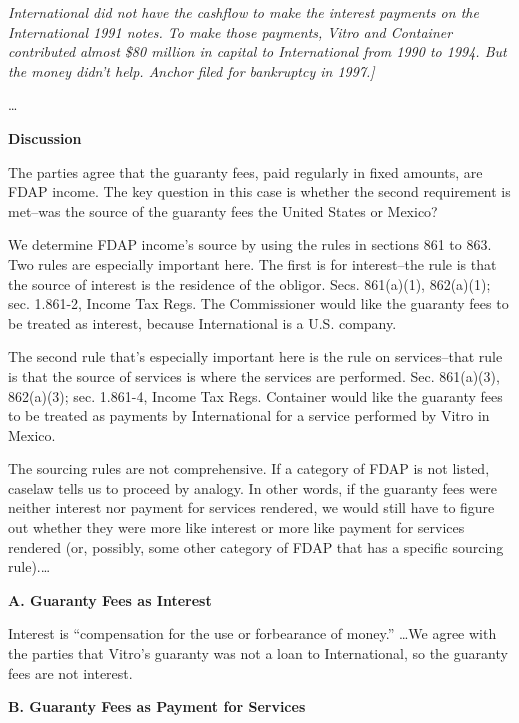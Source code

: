 \begin{select}
\textit{International did not have the cashflow to make the interest payments on the International 1991 notes. To make those payments, Vitro and Container contributed almost \$80 million in capital to International from 1990 to 1994. But the money didn't help.  Anchor filed for bankruptcy in 1997.]}

\ldots

\begin{center} \textbf{Discussion}
\end{center}

The parties agree that the guaranty fees, paid regularly in fixed amounts, are FDAP income. The key question in this case is whether the second requirement is met--was the source of the guaranty fees the United States or Mexico?

We determine FDAP income's source by using the rules in sections 861 to 863. Two rules are especially important here. The first is for interest--the rule is that the source of interest is the residence of the obligor. Secs. 861(a)(1), 862(a)(1); sec. 1.861-2, Income Tax Regs. The Commissioner would like the guaranty fees to be treated as interest, because International  is a U.S. company.

The second rule that's especially important here is the rule on services--that rule is that the source of services is where the services are performed. Sec. 861(a)(3), 862(a)(3); sec. 1.861-4, Income Tax Regs. Container would like the guaranty fees to be treated as payments by International for a service performed by Vitro in Mexico.

The sourcing rules are not comprehensive. If a category of FDAP is not listed, caselaw tells us to proceed by analogy. In other words, if the guaranty fees were neither interest nor payment for services rendered, we would still have to figure out whether they were more like interest or more like payment for services rendered (or, possibly, some other category of FDAP that has a specific sourcing rule).\ldots 

\begin{center}
	\textbf{A. Guaranty Fees as Interest}
\end{center}

Interest is ``compensation for the use or forbearance of money.''  \ldots We agree with the parties that Vitro's guaranty was not a loan to International, so the guaranty fees are not interest.

\begin{center}
	\textbf{B. Guaranty Fees as Payment for Services}
		\end{center}


\end{select}
